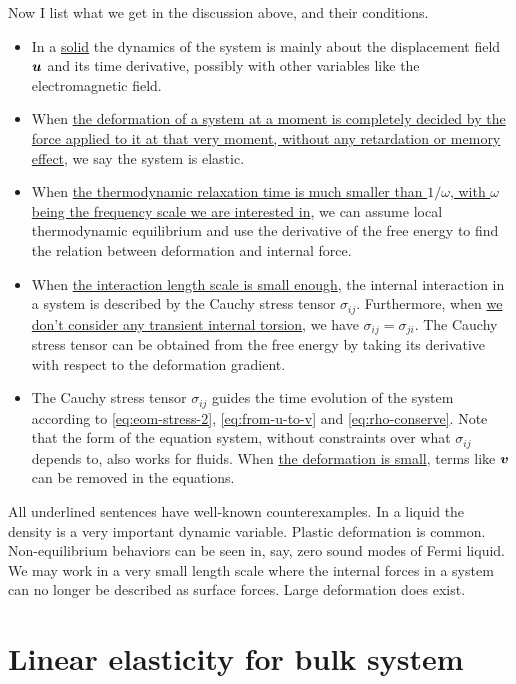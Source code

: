 \documentclass[hyperref, a4paper]{article}
\begin{document}
Now I list what we get in the discussion above, 
and their conditions.
\begin{itemize}
    \item In a \ul{solid} the dynamics of the system is mainly about the 
        displacement field $\vb*{u}$ and its time derivative,
        possibly with other variables like the electromagnetic field.
    \item When \ul{the deformation of a system at a moment is completely decided by the force applied to 
    it at that very moment, 
    without any retardation or memory effect},
    we say the system is elastic.
    \item When \ul{the thermodynamic relaxation time is much smaller 
    than $1 / \omega$, with $\omega$ being the frequency scale we are interested in},
        we can assume local thermodynamic equilibrium
        and use the derivative of the free energy to find 
        the relation between deformation and internal force.
    \item When \ul{the interaction length scale is small enough}, 
    the internal interaction in a system is described by the Cauchy stress tensor $\sigma_{ij}$.
    Furthermore, when \ul{we don't consider any transient internal torsion}, 
    we have $\sigma_{ij} = \sigma_{ji}$.
    The Cauchy stress tensor can be obtained from the free energy 
    by taking its derivative with respect to the deformation gradient.
    \item The Cauchy stress tensor $\sigma_{ij}$ guides the time evolution of the system 
    according to \eqref{eq:eom-stress-2}, \eqref{eq:from-u-to-v} and \eqref{eq:rho-conserve}.
    Note that the form of the equation system,
    without constraints over what $\sigma_{ij}$ depends to,
    also works for fluids.
    When \ul{the deformation is small},
    terms like $\vb*{v}$ can be removed in the equations.
\end{itemize}

All underlined sentences have well-known counterexamples.
In a liquid the density is a very important dynamic variable.
Plastic deformation is common.
Non-equilibrium behaviors can be seen in, say, 
zero sound modes of Fermi liquid.
We may work in a very small length scale 
where the internal forces in a system can no longer be described 
as surface forces.
Large deformation does exist.

\section{Linear elasticity for bulk system}
\end{document}
